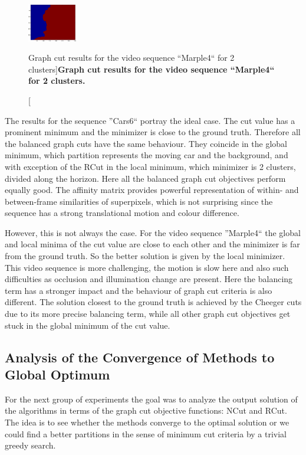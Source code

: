 \begin{figure}[!ht]
{\includegraphics[width=0.19\textwidth]{images/M4_2cl/Local_minimum(ncc,rcc).png}} 
\quad
{} 
\caption[Graph cut results for the video sequence ``Marple4`` for 2 clusters]{
{\bf Graph cut results for the video sequence ``Marple4`` for 2 clusters.}}
\label{fig:M4_cut}
\end{figure}

The results for the sequence ''Cars6`` portray the ideal case. The cut value has a prominent minimum and the minimizer is close to the ground truth. Therefore all the balanced graph cuts have the same behaviour.
They coincide in the global minimum, which partition represents the moving car and the background, and with exception of the RCut in the local minimum, which minimizer is 2 clusters, divided along the horizon.
Here all the balanced graph cut objectives perform equally good. The affinity matrix provides powerful representation of within- and between-frame similarities of superpixels, which is not surprising since
the sequence has a strong translational motion and colour difference.

However, this is not always the case. For the video sequence ''Marple4`` the global and local minima of the cut value are close to each other and the minimizer is far from the ground truth.
So the better solution is given by the local minimizer. This video sequence is more challenging, the motion
is slow here and also such difficulties as occlusion and illumination change are present.
Here the balancing term has a stronger impact and the behaviour of graph cut criteria is also different. The solution closest to the ground truth is
achieved by the Cheeger cuts due to its more precise balancing term, while all other graph cut objectives get stuck in the global minimum of the cut value. 
\subsection{Analysis of the Convergence of Methods to Global Optimum}
For the next group of experiments the goal was to analyze the output solution of the algorithms in terms of the graph cut objective functions: NCut and RCut.
The idea is to see whether the methods converge to the optimal solution or we could find a better partitions in the sense of minimum cut criteria by a trivial greedy search.

